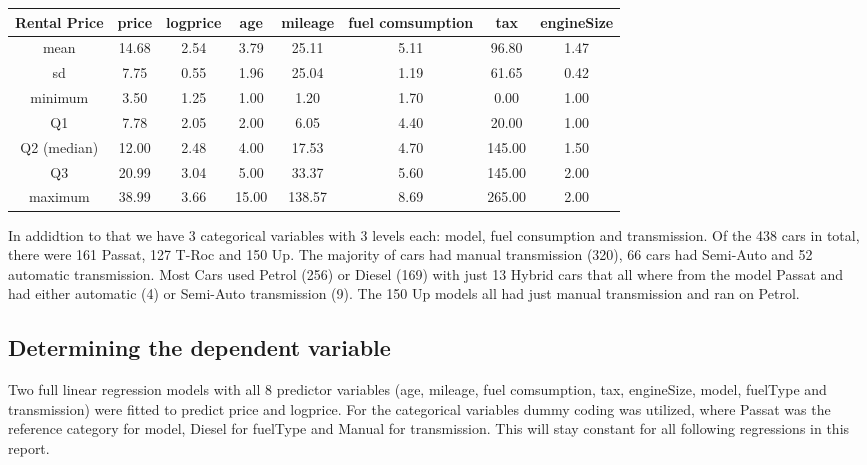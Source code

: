 \documentclass[12 pt]{scrartcl}
\begin{document}
\begin{table}[ht]
  \centering
  \label{tab:descriptives}
  \begin{tabular}{c|cc|ccccc}
    Rental Price & price & logprice & age   & mileage & fuel comsumption & tax    & engineSize \\
    \hline
    mean         & 14.68 & 2.54     & 3.79  & 25.11   & 5.11             & 96.80  & 1.47       \\
    sd           & 7.75  & 0.55     & 1.96  & 25.04   & 1.19             & 61.65  & 0.42       \\
    minimum      & 3.50  & 1.25     & 1.00  & 1.20    & 1.70             & 0.00   & 1.00       \\
    Q1           & 7.78  & 2.05     & 2.00  & 6.05    & 4.40             & 20.00  & 1.00       \\
    Q2 (median)  & 12.00 & 2.48     & 4.00  & 17.53   & 4.70             & 145.00 & 1.50       \\
    Q3           & 20.99 & 3.04     & 5.00  & 33.37   & 5.60             & 145.00 & 2.00       \\
    maximum      & 38.99 & 3.66     & 15.00 & 138.57  & 8.69             & 265.00 & 2.00
  \end{tabular}
\end{table}

In addidtion to that we have 3 categorical variables with 3 levels each: model, fuel consumption and transmission. Of the 438 cars in total, there were 161 Passat, 127 T-Roc and 150 Up. The majority of cars had manual transmission (320), 66 cars had Semi-Auto and 52 automatic transmission. Most Cars used Petrol (256) or Diesel (169) with just 13 Hybrid cars that all where from the model Passat and had either automatic (4) or Semi-Auto transmission (9). The 150 Up models all had just manual transmission and ran on Petrol.

\subsection{Determining the dependent variable}

Two full linear regression models with all 8 predictor variables (age, mileage, fuel comsumption, tax, engineSize, model, fuelType and transmission) were fitted to predict price and logprice. For the categorical variables dummy coding was utilized, where Passat was the reference category for model, Diesel for fuelType and Manual for transmission. This will stay constant for all following regressions in this report.
\end{document}
